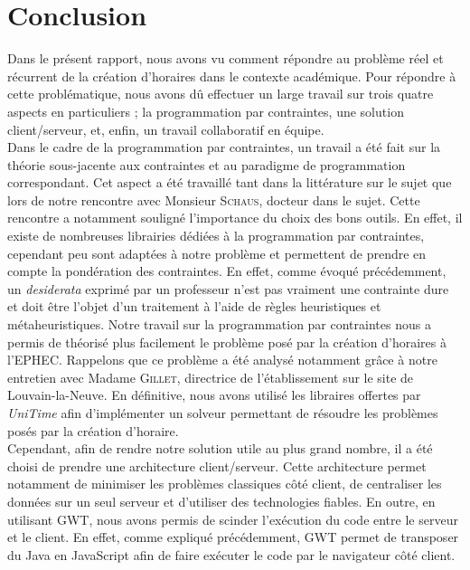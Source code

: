 \chapter*{Conclusion}

Dans le présent rapport, nous avons vu comment répondre au problème réel et récurrent de la création d'horaires dans le contexte académique. Pour répondre à cette problématique, nous avons dû effectuer un large travail sur trois quatre aspects en particuliers ; la programmation par contraintes, une solution client/serveur, et, enfin, un travail collaboratif en équipe.\\
\newline
\indent
Dans le cadre de la programmation par contraintes, un travail a été fait sur la théorie sous-jacente aux contraintes et au paradigme de programmation correspondant. Cet aspect a été travaillé tant dans la littérature sur le sujet que lors de notre rencontre avec Monsieur  \textsc{Schaus}, docteur dans le sujet.
Cette rencontre a notamment souligné l'importance du choix des bons outils. En effet, il existe de nombreuses librairies dédiées à la programmation par contraintes, cependant peu sont adaptées à notre problème et permettent de prendre en compte la pondération des contraintes. En effet, comme évoqué précédemment, un \textit{desiderata} exprimé par un professeur n'est pas vraiment une contrainte dure et doit être l'objet d'un traitement à l'aide de règles heuristiques et métaheuristiques.
\newline
\indent
Notre travail sur la programmation par contraintes nous a permis de théorisé plus facilement le problème posé par la création d'horaires à l'EPHEC. Rappelons que ce problème a été analysé notamment grâce à notre entretien avec Madame \textsc{Gillet}, directrice de l'établissement sur le site de Louvain-la-Neuve.
En définitive, nous avons utilisé les libraires offertes par \textit{UniTime} afin d'implémenter un solveur permettant de résoudre les problèmes posés par la création d'horaire.\\
\newline
\indent
Cependant, afin de rendre notre solution utile au plus grand nombre, il a été choisi de prendre une architecture client/serveur. Cette architecture permet notamment de minimiser les problèmes classiques côté client, de centraliser les données sur un seul serveur et d'utiliser des technologies fiables.
En outre, en utilisant GWT, nous avons permis de scinder l'exécution du code entre le serveur et le client. En effet, comme expliqué précédemment, GWT permet de transposer du Java en JavaScript afin de faire exécuter le code par le navigateur côté client.
